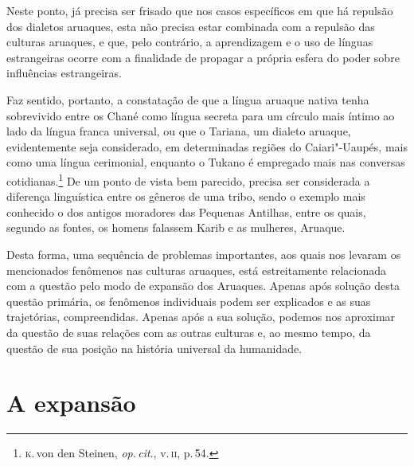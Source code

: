 Neste ponto, já precisa ser frisado que nos casos específicos em que há
repulsão dos dialetos aruaques, esta não precisa estar combinada com a
repulsão das culturas aruaques, e que, pelo contrário, a aprendizagem e o
uso de línguas estrangeiras ocorre com a finalidade de propagar a
própria esfera do poder sobre influências estrangeiras.

Faz sentido, portanto, a constatação de que a língua aruaque nativa tenha sobrevivido entre os Chané
como língua secreta para um círculo mais íntimo ao lado da língua franca universal,
ou que o Tariana, um dialeto aruaque, evidentemente seja considerado, em
determinadas regiões do Caiari"-Uaupés, mais como uma língua cerimonial,
enquanto o Tukano é empregado mais nas conversas cotidianas.\footnote{\textsc{k}.\,von den Steinen, \textit{op.\,cit}., v.\,\textsc{ii}, p.\,54.} De um ponto de vista bem
parecido, precisa ser considerada a diferença linguística entre os gêneros 
de uma tribo, sendo o exemplo mais conhecido o dos antigos
moradores das Pequenas Antilhas, entre os quais, segundo as fontes, os
homens falassem Karib e as mulheres, Aruaque.

Desta forma, uma sequência de problemas importantes, aos quais nos
levaram os mencionados fenômenos nas culturas aruaques, está
estreitamente relacionada com a questão pelo modo de expansão dos
Aruaques. Apenas após solução desta questão primária, os fenômenos
individuais podem ser explicados e as suas trajetórias, compreendidas.
Apenas após a sua solução, podemos nos aproximar da questão de suas
relações com as outras culturas e, ao mesmo tempo, da questão de sua
posição na história universal da humanidade.


\chapter*{A expansão\smallskip{}}

